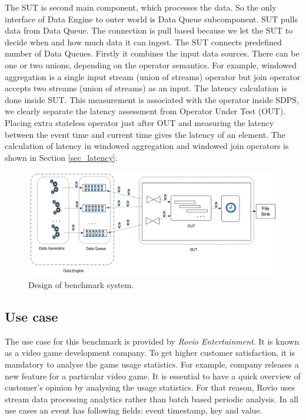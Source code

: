 \documentclass{vldb}
\begin{document}
The SUT is second main component, which processes the data. So the only interface of Data Engine to outer world is Data Queue subcomponent. SUT pulls data from Data Queue. The connection is pull based because we let the SUT to decide when and how much data it can ingest. The SUT connects predefined number of Data Queues. Firstly it combines the input data sources. There can be one or two unions, depending on the operator semantics. For example, windowed aggregation is a single input stream (union of streams) operator but join operator accepts two streams (union of streams) as an input. The latency calculation is done inside SUT. This measurement is associated with the operator inside SDPS, we clearly separate the latency assessment from Operator Under Test (OUT). Placing extra stateless operator just after OUT and measuring the latency between the event time and current time gives the latency of an element. The calculation of latency in windowed aggregation and windowed join operators is shown in Section \ref{sec_latency}. 


%
%

\begin{figure}[h]
\centering
\includegraphics[width=1\textwidth]{system_design}
\caption{Design of benchmark system.}
\label{fig_design}
\end{figure}

\subsection{Use case}
The use case for this benchmark is provided by \textit{ Rovio Entertainment}. It is known as a video game development company. To get higher customer satisfaction, it is mandatory to analyse the game usage statistics. For example, company releases a new feature for a particular video game. It is essential to have a quick overview of customer's opinion by analysing the usage statistics. For that reason, Rovio uses stream data processing analytics rather than batch based periodic analysis.  In all use cases an event has following fields: event timestamp, key and value. 
\end{document}
